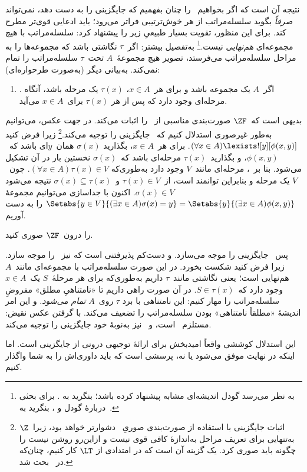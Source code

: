 \documentclass[../../../include/open-logic-section]{subfiles}
\begin{document}
نتیجه آن است که اگر بخواهیم~\stagesinex{} را چنان بفهمیم که جایگزینی
را به دست دهد، نمی‌تواند \emph{صرفاً} بگوید سلسله‌مراتب از هر خوش‌ترتیبی
فراتر می‌رود؛ باید ادعایی قوی‌تر مطرح کند. برای این منظور،
\citet{Shoenfield:AST} تقویت بسیار طبیعیِ زیر را پیشنهاد کرد: سلسله‌مراتب
با هیچ مجموعه‌ای \emph{هم‌نهایی} نیست.\footnote{به نظر می‌رسد گودل
اندیشه‌ای مشابه پیشنهاد کرده باشد؛ بنگرید به
\citet[p.~223]{Potter2004}. برای بحثی دربارهٔ گودل و
\citeauthor{Shoenfield:AST}، بنگرید به~\citet[90--5]{Incurvati2020}.}
به‌تفصیل بیشتر: اگر~$\tau$ نگاشتی باشد که مجموعه‌ها را به مراحل
سلسله‌مراتب می‌فرستد، تصویر هیچ مجموعهٔ~$A$ تحت~$\tau$ سلسله‌مراتب را
تمام نمی‌کند. به‌بیانی دیگر (به‌صورت طرحواره‌ای):
\begin{enumerate}
	\item[] \stagescofin. اگر~$A$ یک مجموعه باشد و برای هر~$x\in A$،
	$\tau(x)$ یک مرحله باشد، آنگاه مرحله‌ای وجود دارد که پس از هر
	$\tau(x)$ برای~$x\in A$ می‌آید.
\end{enumerate}
بدیهی است که~$\ZF$ صورت‌بندی مناسبی از~\stagescofin{} را اثبات می‌کند.
در جهت عکس، می‌توانیم به‌طور غیرصوری استدلال کنیم که~\stagescofin{}
جایگزینی را توجیه می‌کند.\footnote{اثبات جایگزینی با استفاده از
صورت‌بندی صوریِ~\stagescofin{} دشوارتر خواهد بود، زیرا~$\Z$ به‌تنهایی
برای تعریف مراحل به‌اندازهٔ کافی قوی نیست و ازاین‌رو روشن نیست
\stagescofin{} را چگونه باید صوری کرد. یک گزینه آن است که در امتدادی از
$\LT$ کار کنیم، چنان‌که در~
بحث شد.} زیرا فرض کنید
$(\forall x \in A)\lexists![y][\phi(x,y)]$. برای هر~$x\in A$، بگذارید
$\sigma(x)$ همان~$y$ای باشد که~$\phi(x,y)$، و بگذارید~$\tau(x)$ مرحله‌ای
باشد که~$\sigma(x)$ نخستین بار در آن تشکیل می‌شود. بنا بر~\stagescofin،
مرحله‌ای مانند~$V$ وجود دارد به‌طوری‌که
$(\forall x\in A)\tau(x)\in V$. چون~$V$ یک مرحله و بنابراین توانمند است،
از~$\tau(x)\in V$ و~$\sigma(x)\subseteq\tau(x)$ نتیجه می‌شود
$\sigma(x)\in V$. اکنون با جداسازی می‌توانیم مجموعهٔ
$\Setabs{y \in V}{(\exists x \in A)\sigma(x) = y} =
\Setabs{y}{(\exists x \in A)\phi(x,y)}$ را به دست آوریم.

\begin{prob}
	\stagescofin{} را درون~$\ZF$ صوری کنید.
\end{prob}

پس~\stagescofin{} جایگزینی را موجه می‌سازد. و دست‌کم پذیرفتنی است که
\stagesinex{} نیز~\stagescofin{} را موجه سازد. زیرا فرض کنید
\stagescofin{} شکست بخورد. در این صورت سلسله‌مراتب با مجموعه‌ای مانند~$A$
هم‌نهایی است؛ یعنی نگاشتی مانند~$\tau$ داریم به‌طوری‌که برای هر مرحلهٔ~$S$
یک~$x\in A$ وجود دارد که~$S\in\tau(x)$. در آن صورت راهی داریم تا
«نامتناهیِ مطلق» مفروضِ سلسله‌مراتب را مهار کنیم: این نامتناهی با برد
$\tau$ روی~$A$ \emph{تمام می‌شود}. و این امر اندیشهٔ «مطلقاً نامتناهی»
بودن سلسله‌مراتب را تضعیف می‌کند. با گرفتن عکس نقیض:
\stagesinex{} مستلزم~\stagescofin{} است، و~\stagescofin{} نیز به‌نوبهٔ
خود جایگزینی را توجیه می‌کند.

این استدلال کوششی واقعاً امیدبخش برای ارائهٔ توجیهی درونی از جایگزینی
است. اما اینکه در نهایت موفق می‌شود یا نه، پرسشی است که باید داوری‌اش را
به شما واگذار کنیم.
\end{document}
